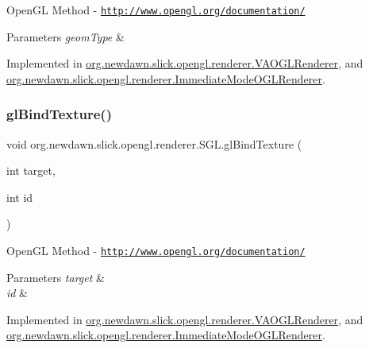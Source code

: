 Open\+GL Method -\/  \href{http://www.opengl.org/documentation/}{\tt http\+://www.\+opengl.\+org/documentation/}


\begin{DoxyParams}{Parameters}
{\em geom\+Type} & \\
\hline
\end{DoxyParams}


Implemented in \mbox{\hyperlink{classorg_1_1newdawn_1_1slick_1_1opengl_1_1renderer_1_1_v_a_o_g_l_renderer_ad75148fef06b01d129847e657f19a561}{org.\+newdawn.\+slick.\+opengl.\+renderer.\+V\+A\+O\+G\+L\+Renderer}}, and \mbox{\hyperlink{classorg_1_1newdawn_1_1slick_1_1opengl_1_1renderer_1_1_immediate_mode_o_g_l_renderer_a284c45b331dcb985b62dc903dddc9a37}{org.\+newdawn.\+slick.\+opengl.\+renderer.\+Immediate\+Mode\+O\+G\+L\+Renderer}}.

\mbox{\label{interfaceorg_1_1newdawn_1_1slick_1_1opengl_1_1renderer_1_1_s_g_l_a7b546bba69c511f7d96d055ac1ed6a21}} 
\subsubsection{\texorpdfstring{gl\+Bind\+Texture()}{glBindTexture()}}
{\footnotesize\ttfamily void org.\+newdawn.\+slick.\+opengl.\+renderer.\+S\+G\+L.\+gl\+Bind\+Texture (\begin{DoxyParamCaption}\item[{int}]{target,  }\item[{int}]{id }\end{DoxyParamCaption})}

Open\+GL Method -\/  \href{http://www.opengl.org/documentation/}{\tt http\+://www.\+opengl.\+org/documentation/}


\begin{DoxyParams}{Parameters}
{\em target} & \\
\hline
{\em id} & \\
\hline
\end{DoxyParams}


Implemented in \mbox{\hyperlink{classorg_1_1newdawn_1_1slick_1_1opengl_1_1renderer_1_1_v_a_o_g_l_renderer_a1a3ed406d01bd2ed60c35145d0539805}{org.\+newdawn.\+slick.\+opengl.\+renderer.\+V\+A\+O\+G\+L\+Renderer}}, and \mbox{\hyperlink{classorg_1_1newdawn_1_1slick_1_1opengl_1_1renderer_1_1_immediate_mode_o_g_l_renderer_a5887392f19764461545bcdb31b6b48b0}{org.\+newdawn.\+slick.\+opengl.\+renderer.\+Immediate\+Mode\+O\+G\+L\+Renderer}}.


